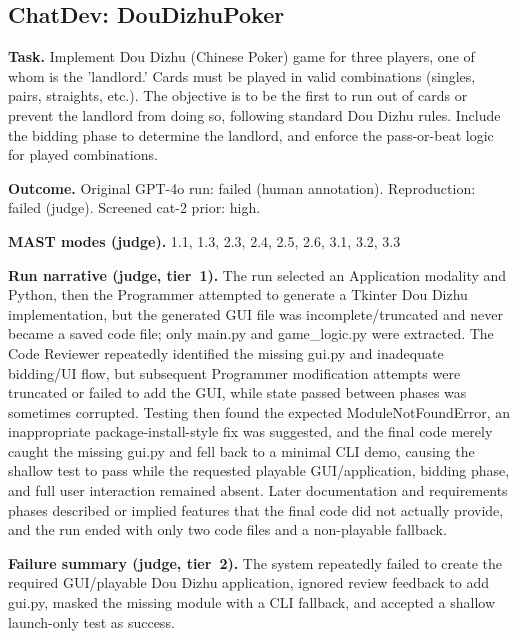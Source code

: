 \subsection*{ChatDev: DouDizhuPoker}
\textbf{Task.} Implement Dou Dizhu (Chinese Poker) game for three players, one of whom is the 'landlord.' Cards must be played in valid combinations (singles, pairs, straights, etc.). The objective is to be the first to run out of cards or prevent the landlord from doing so, following standard Dou Dizhu rules. Include the bidding phase to determine the landlord, and enforce the pass-or-beat logic for played combinations.

\textbf{Outcome.} Original GPT-4o run: failed (human annotation). Reproduction: failed (judge). Screened cat-2 prior: high.

\textbf{MAST modes (judge).} 1.1, 1.3, 2.3, 2.4, 2.5, 2.6, 3.1, 3.2, 3.3

\textbf{Run narrative (judge, tier~1).} The run selected an Application modality and Python, then the Programmer attempted to generate a Tkinter Dou Dizhu implementation, but the generated GUI file was incomplete/truncated and never became a saved code file; only main.py and game\_logic.py were extracted. The Code Reviewer repeatedly identified the missing gui.py and inadequate bidding/UI flow, but subsequent Programmer modification attempts were truncated or failed to add the GUI, while state passed between phases was sometimes corrupted. Testing then found the expected ModuleNotFoundError, an inappropriate package-install-style fix was suggested, and the final code merely caught the missing gui.py and fell back to a minimal CLI demo, causing the shallow test to pass while the requested playable GUI/application, bidding phase, and full user interaction remained absent. Later documentation and requirements phases described or implied features that the final code did not actually provide, and the run ended with only two code files and a non-playable fallback.

\textbf{Failure summary (judge, tier~2).} The system repeatedly failed to create the required GUI/playable Dou Dizhu application, ignored review feedback to add gui.py, masked the missing module with a CLI fallback, and accepted a shallow launch-only test as success.

